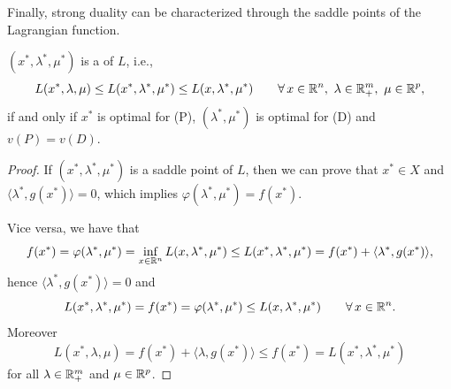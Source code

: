 Finally, strong duality can be characterized through the saddle points of the Lagrangian function.

\begin{theorem}
    $(x^*, \lambda^*, \mu^*)$ is a  of $L$, i.e.,
    \[
        L(x^*, \lambda, \mu) \le L(x^*, \lambda^*, \mu^*) \le L(x, \lambda^*, \mu^*) \qquad \forall\, x \in \mathbb{R}^n,\ \lambda \in \mathbb{R}^m_+,\ \mu \in \mathbb{R}^p,
    \]
    if and only if $x^*$ is optimal for (P), $(\lambda^*, \mu^*)$ is optimal for (D) and $v(P) = v(D)$.
\end{theorem}

\begin{proof}
    If $(x^*, \lambda^*, \mu^*)$ is a saddle point of $L$, then we can prove that $x^* \in X$ and $\langle \lambda^*, g(x^*) \rangle = 0$, which implies $\varphi(\lambda^*, \mu^*) = f(x^*)$.

    Vice versa, we have that
    \[
        f(x^*) = \varphi(\lambda^*, \mu^*) = \inf_{x \in \mathbb{R}^n} L(x, \lambda^*, \mu^*) \le L(x^*, \lambda^*, \mu^*) = f(x^*) + \langle \lambda^*, g(x^*) \rangle,
    \]
    hence $\langle \lambda^*, g(x^*) \rangle = 0$ and
    \[
        L(x^*, \lambda^*, \mu^*) = f(x^*) = \varphi(\lambda^*, \mu^*) \le L(x, \lambda^*, \mu^*) \qquad \forall\, x \in \mathbb{R}^n.
    \]
    Moreover
    \[
        L(x^*, \lambda, \mu) = f(x^*) + \langle \lambda, g(x^*) \rangle \le f(x^*) = L(x^*, \lambda^*, \mu^*)
    \]
    for all $\lambda \in \mathbb{R}^m_+$ and $\mu \in \mathbb{R}^p$.
\end{proof}
